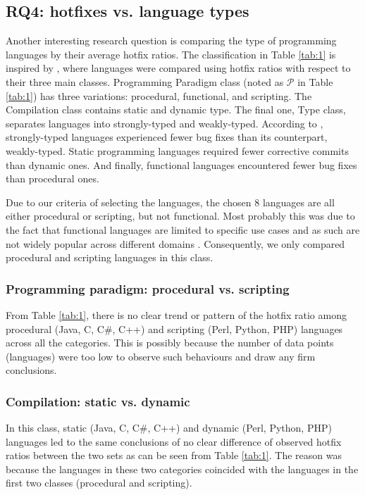 \documentclass{sig-alternate}
\begin{document}
\subsection{RQ4: hotfixes vs. language types}
Another interesting research question is comparing the type of programming languages by their average hotfix ratios. The classification in Table \ref{tab:1} is inspired by \cite{Ray2014}, where languages were compared using hotfix ratios with respect to their three main classes. Programming Paradigm class (noted as $\mathcal{P}$ in Table \ref{tab:1}) has three variations: procedural, functional, and scripting. The Compilation class contains static and dynamic type. The final one, Type class, separates languages into strongly-typed and weakly-typed. According to \cite{Ray2014}, strongly-typed languages experienced fewer bug fixes than its counterpart, weakly-typed. Static programming languages required fewer corrective commits than dynamic ones. And finally, functional languages encountered fewer bug fixes than procedural ones.

Due to our criteria of selecting the languages, the chosen 8 languages are all either procedural or scripting, but not functional. Most probably this was due to the fact that functional languages are limited to specific use cases and as such are not widely popular across different domains  \cite{Wadler1999}. Consequently, we only compared procedural and scripting languages in this class.

\subsubsection*{Programming paradigm: procedural vs. scripting}
From Table \ref{tab:1}, there is no clear trend or pattern of the hotfix ratio among procedural (Java, C, C\#, C++) and scripting (Perl, Python, PHP) languages across all the categories. This is possibly because the number of data points (languages) were too low to observe such behaviours and draw any firm conclusions. %

\subsubsection*{Compilation: static vs. dynamic}
In this class, static (Java, C, C\#, C++) and dynamic (Perl, Python, PHP) languages led to the same conclusions of no clear difference of observed hotfix ratios between the two sets as can be seen from Table \ref{tab:1}. The reason was because the languages in these two categories coincided with the languages in the first two classes (procedural and scripting).
\end{document}
